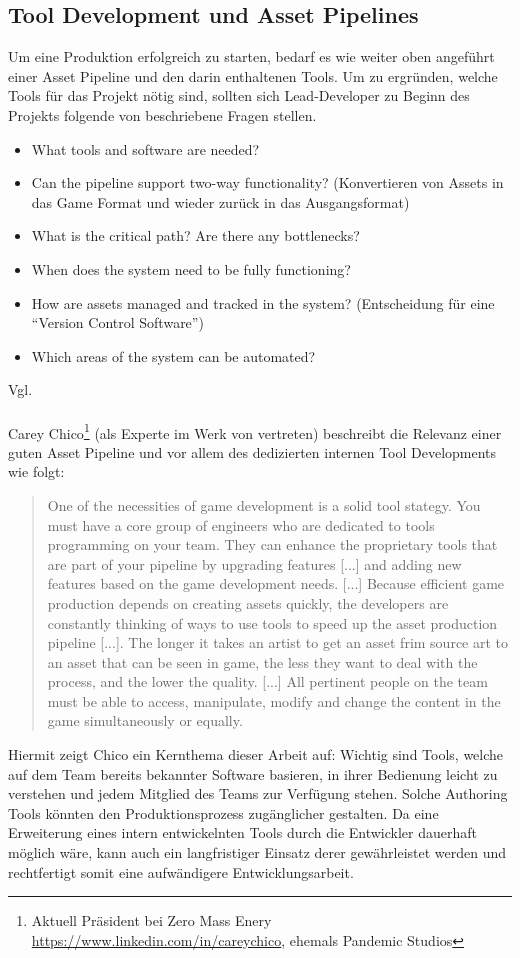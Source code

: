 \documentclass[pagesize, paper=a4, fontsize=12pt, titlepage=true, headings=small, headnosepline, abstractoff, liststotoc, nochapterprefix, plainheadsepline, twoside]{scrreprt}
\begin{document}
\subsection {Tool Development und Asset Pipelines}
Um eine Produktion erfolgreich zu starten, bedarf es wie weiter oben angeführt einer Asset Pipeline und den darin enthaltenen Tools. Um zu ergründen, welche Tools für das Projekt nötig sind, sollten sich Lead-Developer zu Beginn des Projekts folgende von \cite{Chandler2006} beschriebene Fragen stellen.
\begin{itemize}
\item What tools and software are needed?
\item Can the pipeline support two-way functionality? (Konvertieren von Assets in das Game Format und wieder zurück in das Ausgangsformat)
\item What is the critical path? Are there any bottlenecks?
\item When does the system need to be fully functioning?
\item How are assets managed and tracked in the system? (Entscheidung für eine “Version Control Software”)
\item Which areas of the system can be automated?
\end{itemize} Vgl. \autocite[S. 224-225]{Chandler2006}
\\
\\
Carey Chico\footnote{Aktuell Präsident bei Zero Mass Enery \url{https://www.linkedin.com/in/careychico}, ehemals Pandemic Studios} (als Experte im Werk von \cite{Chandler2006} vertreten) beschreibt die Relevanz einer guten Asset Pipeline und vor allem des dedizierten internen Tool Developments wie folgt:
\begin{quote}
One of the necessities of game development is a solid tool stategy. You must have a core group of engineers who are dedicated to tools programming on your team. They can enhance the proprietary tools that are part of your pipeline by upgrading features [...] and adding new features based on the game development needs. [...] Because efficient game production depends on creating assets quickly, the developers are constantly thinking of ways to use tools to speed up the asset production pipeline [...]. The longer it takes an artist to get an asset frim source art to an asset that can be seen in game, the less they want to deal with the process, and the lower the quality.
[...]
All pertinent people on the team must be able to access, manipulate, modify and change the content in the game simultaneously or equally.
\autocite[S. 224-225]{Chandler2006}
\end{quote}
Hiermit zeigt Chico ein Kernthema dieser Arbeit auf: Wichtig sind Tools, welche auf dem Team bereits bekannter Software basieren, in ihrer Bedienung leicht zu verstehen und jedem Mitglied des Teams zur Verfügung stehen. Solche Authoring Tools könnten den Produktionsprozess zugänglicher gestalten. Da eine Erweiterung eines intern entwickelnten Tools durch die Entwickler dauerhaft möglich wäre, kann auch ein langfristiger Einsatz derer gewährleistet werden und rechtfertigt somit eine aufwändigere Entwicklungsarbeit.
\end{document}
